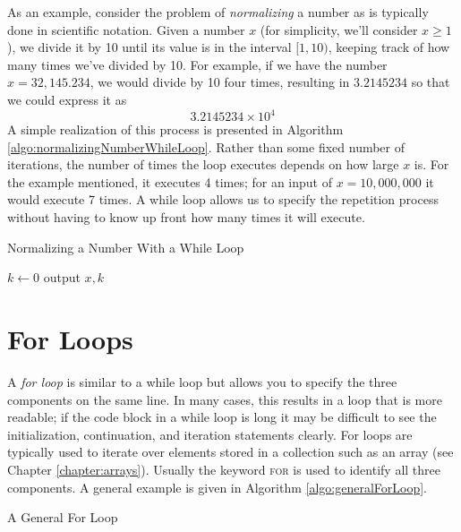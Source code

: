 As an example, consider the problem of \emph{normalizing} a number as is typically done in scientific notation.  Given a number $x$ (for simplicity, we'll consider $x \geq 1$),
we divide it by 10 until its value is in the interval $[1, 10)$, keeping track of how many times we've 
divided by 10.  For example, if we have the number $x = 32,145.234$, we would divide
by 10 four times, resulting in $3.2145234$ so that we could express it as
  $$3.2145234 \times 10^{4}$$
A simple realization of this process is presented in Algorithm 
\ref{algo:normalizingNumberWhileLoop}.  Rather than some fixed number of
iterations, the number of times the loop executes depends on how large $x$ is.  For the example
mentioned, it executes 4 times; for an input of $x = 10,000,000$ it would execute 7 times.
A while loop allows us to specify the repetition process without having to know up front
how many times it will execute.

\begin{algorithm}[H]
\caption{Normalizing a Number With a While Loop}
\label{algo:normalizingNumberWhileLoop}
$k \leftarrow 0$ \;
output $x, k$ \;
\end{algorithm}

\section{For Loops}

A \emph{for loop} is similar to a while loop but allows you to specify 
the three components on the same line.  In many cases, this results in a loop that
is more readable; if the code block in a while loop is long it may be difficult to see
the initialization, continuation, and iteration statements clearly.  For loops are 
typically used to iterate over elements stored in a collection such as an
array (see Chapter \ref{chapter:arrays}).  Usually the keyword \textsc{for} is used to identify all three components.  
A general example is given in Algorithm \ref{algo:generalForLoop}.

\begin{algorithm}[]
\caption{A General For Loop}
\label{algo:generalForLoop}
\end{algorithm}

